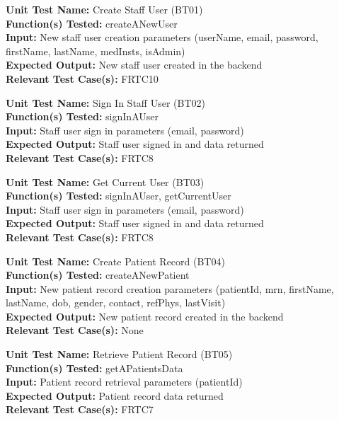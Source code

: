 \documentclass[12pt, titlepage]{article}
\begin{document}
\begin{mdframed}[linewidth=0.5mm]
  \textbf{Unit Test Name:} Create Staff User (BT01) \\
  \textbf{Function(s) Tested:} createANewUser \\
  \textbf{Input:} New staff user creation parameters (userName, email, password, firstName, lastName, medInsts, isAdmin) \\
  \textbf{Expected Output:} New staff user created in the backend \\
  \textbf{Relevant Test Case(s):} FRTC10
\end{mdframed}

\begin{mdframed}[linewidth=0.5mm]
  \textbf{Unit Test Name:} Sign In Staff User (BT02) \\
  \textbf{Function(s) Tested:} signInAUser \\
  \textbf{Input:} Staff user sign in parameters (email, password) \\
  \textbf{Expected Output:} Staff user signed in and data returned \\
  \textbf{Relevant Test Case(s):} FRTC8
\end{mdframed}

\begin{mdframed}[linewidth=0.5mm]
  \textbf{Unit Test Name:} Get Current User (BT03) \\
  \textbf{Function(s) Tested:} signInAUser, getCurrentUser \\
  \textbf{Input:} Staff user sign in parameters (email, password) \\
  \textbf{Expected Output:} Staff user signed in and data returned \\
  \textbf{Relevant Test Case(s):} FRTC8
\end{mdframed}

\begin{mdframed}[linewidth=0.5mm]
  \textbf{Unit Test Name:} Create Patient Record (BT04) \\
  \textbf{Function(s) Tested:} createANewPatient \\
  \textbf{Input:} New patient record creation parameters (patientId, mrn, firstName, lastName, dob, gender, contact, refPhys, lastVisit) \\
  \textbf{Expected Output:} New patient record created in the backend \\
  \textbf{Relevant Test Case(s):} None
\end{mdframed}

\begin{mdframed}[linewidth=0.5mm]
  \textbf{Unit Test Name:} Retrieve Patient Record (BT05) \\
  \textbf{Function(s) Tested:} getAPatientsData \\
  \textbf{Input:} Patient record retrieval parameters (patientId) \\
  \textbf{Expected Output:} Patient record data returned \\
  \textbf{Relevant Test Case(s):} FRTC7
\end{mdframed}
\end{document}
